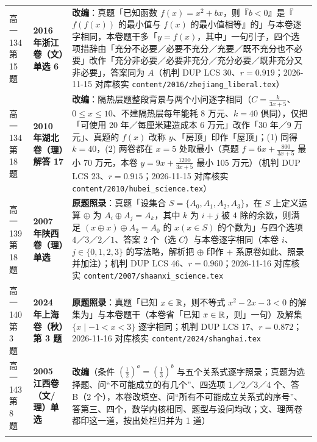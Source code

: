 \documentclass[a4paper,11pt]{article}
\begin{document}
\begin{xltabular}{\textwidth}{@{}>{\raggedright\arraybackslash}p{2.85cm}>{\raggedright\arraybackslash}p{3.99cm}>{\raggedright\arraybackslash}p{7.89cm}@{}}
高一134 第 15 题 & \textbf{2016 年浙江卷（文）单选 6} & \textbf{改编}：真题「已知函数 \(f(x)=x^2+bx\)，则『\(b<0\)』是『\(f(f(x))\) 的最小值与 \(f(x)\) 的最小值相等』的」与本卷逐字相同，本卷题干多「\(y=f(x)\)，其中」一句引子，四个选项措辞由「充分不必要／必要不充分／充要／既不充分也不必要」改作「充分非必要／必要非充分／充分必要／既非充分又非必要」，答案同为 \(A\)（机判 DUP LCS 30、\(r=\allowbreak 0.919\)；2026-11-15 对库核实 \texttt{content/\allowbreak{}2016/\allowbreak{}zhejiang\_liberal.tex}） \\ \addlinespace[1pt]
高一134 第 18 题 & \textbf{2010 年湖北卷（理）解答 17} & \textbf{改编}：隔热层题整段背景与两个小问逐字相同（\(C=\allowbreak \frac{k}{3x+\allowbreak 5}\)、\(0\leqslant\allowbreak  x\leqslant\allowbreak 10\)、不建隔热层每年能耗 8 万元、\(k=\allowbreak 40\) 俱同），仅把「可使用 20 年／每厘米建造成本 6 万元」改作「30 年／9 万元」、真题的 \(f(x)\) 改称 \(y\)、「房顶」印作「屋顶」；(1) 同得 \(k=\allowbreak 40\)，(2) 两卷都在 \(x=\allowbreak 5\) 处取最小（真题 \(f=\allowbreak 6x+\allowbreak \frac{800}{3x+\allowbreak 5}\) 最小 70 万元，本卷 \(y=\allowbreak 9x+\allowbreak \frac{1200}{3x+\allowbreak 5}\) 最小 105 万元）（机判 DUP LCS 23、\(r=\allowbreak 0.915\)；2026-11-15 对库核实 \texttt{content/\allowbreak{}2010/\allowbreak{}hubei\_science.tex}） \\ \addlinespace[1pt]
高一139 第 18 题 & \textbf{2007 年陕西卷（理）单选} & \textbf{原题照录}：真题「设集合 \(S=\allowbreak \{A_0,A_1,A_2,A_3\}\)，在 \(S\) 上定义运算 \(\oplus\) 为 \(A_i\oplus A_j=A_k\)，其中 \(k\) 为 \(i+j\) 被 \(4\) 除的余数，则满足 \((x\oplus x)\oplus A_2=A_0\) 的 \(x(x\in S)\) 的个数为」与四个选项 \(4\)／\(3\)／\(2\)／\(1\)、答案 \(2\) 个（选 \(C\)）与本卷逐字相同（本卷 \(i\)、\(j\in\{0,\allowbreak 1,\allowbreak 2,\allowbreak 3\}\) 的写法略，解析把 \(\oplus\) 印作 \(+\allowbreak \) 系原卷如此、照录并加注）；机判 DUP LCS 46、\(r=\allowbreak 0.960\)；2026-11-16 对库核实 \texttt{content/\allowbreak{}2007/\allowbreak{}shaanxi\_science.tex} \\ \addlinespace[1pt]
高一140 第 3 题 & \textbf{2024 年上海卷（秋）第 3 题} & \textbf{原题照录}：真题「已知 \(x\in\mathbb{R}\)，则不等式 \(x^2-2x-3<0\) 的解集为」与本卷题干（本卷省「已知 \(x\in\mathbb{R}\)，则」一句）及解集 \(\{x\mid\allowbreak -1<x<3\}\) 逐字相同；机判 DUP LCS 17、\(r=\allowbreak 0.872\)；2026-11-16 对库核实 \texttt{content/\allowbreak{}2024/\allowbreak{}shanghai.tex} \\ \addlinespace[1pt]
高一143 第 8 题 & \textbf{2005 江西卷（文/理）单选} & \textbf{改编}（条件 \((\frac12)^a=\allowbreak (\frac13)^b\) 与五个关系式逐字照录；真题为选择题、问``不可能成立的有几个''、四选项 1／2／3／4 个、答 B（2 个），本卷改填空、问``所有不可能成立关系式的序号''、答第三、四个，数学内核相同、题型与设问均改；文、理两卷都印这一道，按出处栏归并为 1 道） \\ \addlinespace[1pt]

\end{xltabular}
\end{document}

